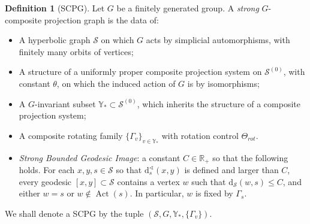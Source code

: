 \documentclass[svgnames]{amsart}
\theoremstyle{plain}
\theoremstyle{definition}
\newtheorem{defn}[thm]{Definition}
\newcommand{\dist}{\mathrm{d}}
\newcommand{\Act}{\operatorname{Act}}
\newcommand{\calS}{\mathcal{S}}
\renewcommand{\angle}{\sphericalangle}
\begin{document}
\begin{defn}[SCPG]\label{dfn:scpg} Let $G$ be a finitely generated group. A \emph{strong} $G$-composite projection graph is the data of:
\begin{itemize}
    \item A hyperbolic graph $\calS$ on which $G$ acts by simplicial automorphisms, with finitely many orbits of vertices;
    \item A structure of a uniformly proper composite projection system on $\calS^{(0)}$, with constant $\theta$, on which the induced action of $G$ is by isomorphisms;
    \item A $G$-invariant subset $\mathbb{Y}_*\subset \calS^{(0)}$, which inherits the structure of a composite projection system;
    \item A composite rotating family $\{\Gamma_v\}_{v\in\mathbb{Y}_*}$ with rotation control $\Theta_{rot}$.
    \item \emph{Strong Bounded Geodesic Image}: a constant $C\in\mathbb{R}_+$ so that the following holds. For each $x, y, s \in \mathcal S$ so that $\dist^\angle_s(x, y)$ is defined and larger than $C$, every geodesic $[x, y]\subset \calS$ contains a vertex $w$ such that $\dist_{\calS}(w,s)\le C$, and either $w=s$ or $w\not\in \Act(s)$. In particular, $w$ is fixed by $\Gamma_s$. 
\end{itemize}
We shall denote a SCPG by the tuple $(\mathcal S, G, \mathbb{Y}_*, \{\Gamma_v\})$.
\end{defn}
\end{document}
